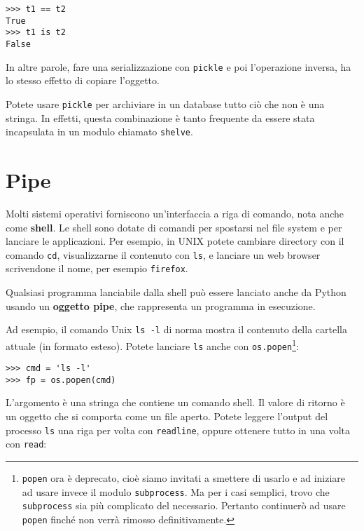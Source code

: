 \documentclass[10pt]{book}
\begin{document}
\begin{verbatim}
>>> t1 == t2
True
>>> t1 is t2
False
\end{verbatim}
%
In altre parole, fare una serializzazione con {\tt pickle} e poi l'operazione inversa, ha lo stesso effetto di copiare l'oggetto.

Potete usare {\tt pickle} per archiviare in un database tutto ciò che non è una stringa. In effetti, questa combinazione è tanto frequente da essere stata incapsulata in un modulo chiamato {\tt shelve}.  


\section{Pipe}

Molti sistemi operativi forniscono un'interfaccia a riga di comando, nota anche come {\bf shell}.  Le shell sono dotate di comandi per spostarsi nel file system e per lanciare le applicazioni. Per esempio, in UNIX potete cambiare directory con il comando {\tt cd},
visualizzarne il contenuto con {\tt ls}, e lanciare un web browser scrivendone il nome, per esempio {\tt firefox}.

Qualsiasi programma lanciabile dalla shell può essere lanciato anche da Python usando un {\bf oggetto pipe}, che rappresenta un programma in esecuzione.

Ad esempio, il comando Unix {\tt ls -l} di norma mostra il contenuto della cartella attuale (in formato esteso). Potete lanciare {\tt ls} anche con {\tt os.popen}\footnote{{\tt popen} ora è deprecato, cioè siamo invitati a smettere di usarlo e ad iniziare ad usare invece il modulo {\tt subprocess}. Ma per i casi semplici, trovo che
{\tt subprocess} sia più complicato del necessario. Pertanto continuerò ad usare {\tt popen} finché non verrà rimosso definitivamente.}:

\begin{verbatim}
>>> cmd = 'ls -l'
>>> fp = os.popen(cmd)
\end{verbatim}
%
L'argomento è una stringa che contiene un comando shell. Il valore di ritorno è un oggetto che si comporta come un file aperto. Potete leggere l'output del processo {\tt ls} una riga per volta con {\tt readline}, oppure ottenere tutto in una volta con {\tt read}:
\end{document}
